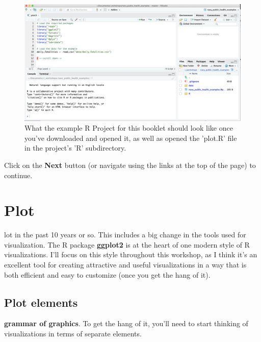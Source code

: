 \documentclass[]{tufte-book}
\begin{document}
\begin{figure}
\includegraphics[width=38.64in]{images/example_repo} \caption[What the example R Project for this booklet should look like once you've downloaded and opened it, as well as opened the 'plot.R' file in the project's 'R' subdirectory]{What the example R Project for this booklet should look like once you've downloaded and opened it, as well as opened the 'plot.R' file in the project's 'R' subdirectory.}\label{fig:examplerepo}
\end{figure}

Click on the \textbf{Next} button (or navigate using the
links at the top of the page) to continue.

\hypertarget{plot}{%
\chapter{Plot}\label{plot}}

 lot in the past 10 years or so. This
includes a big
change in the tools used for visualization. The R package \textbf{ggplot2} \citep{R-ggplot2}
is at the heart of one modern style of R visualizations. I'll focus on this style
throughout this workshop, as I think it's an excellent tool for creating
attractive and useful visualizations in a way that is both efficient and easy
to customize (once you get the hang of it).

\hypertarget{plot-elements}{%
\section{Plot elements}\label{plot-elements}}

 \textbf{grammar of graphics}. To get the hang
of it, you'll need to start thinking of visualizations in terms of separate elements.
\end{document}
